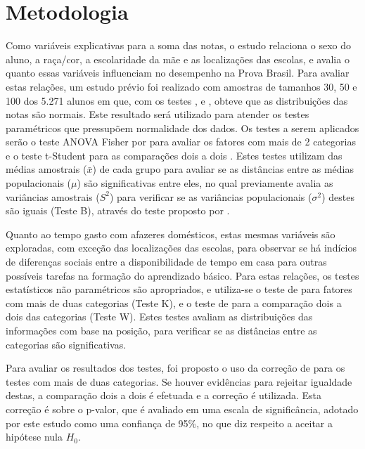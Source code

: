 

\chapter{Metodologia}
Como variáveis explicativas para a soma das notas, o estudo relaciona o sexo do aluno, a raça/cor, a escolaridade da mãe e as localizações das escolas,
e avalia o quanto essas variáveis influenciam no desempenho na Prova Brasil. Para avaliar estas relações, um estudo prévio foi realizado
com amostras de tamanhos 30, 50 e 100 dos 5.271 alunos em que, com os testes , 
e , obteve que as distribuições das notas são normais. Este resultado será utilizado para atender
os testes paramétricos que pressupõem normalidade dos dados. Os testes a serem aplicados serão o teste ANOVA Fisher por  para 
avaliar os fatores com mais de 2 categorias e o teste t-Student para as comparações dois a dois \cite{o1908student}.
Estes testes utilizam das médias amostrais ($\bar{x}$) de cada grupo para avaliar se as distâncias entre as médias 
populacionais ($\mu$) são significativas entre eles, no qual previamente avalia as
variâncias amostrais ($S^2$) para verificar se as variâncias populacionais ($\sigma^2$) destes são iguais (Teste B), através do teste proposto por .

Quanto ao tempo gasto com afazeres domésticos, estas mesmas variáveis são exploradas, com exceção das localizações das escolas,
para observar se há indícios de diferenças sociais entre a disponibilidade de tempo em casa para outras possíveis 
tarefas na formação do aprendizado básico. Para estas relações, os testes estatísticos não paramétricos são apropriados,
e utiliza-se o teste de  para fatores com mais de duas categorias (Teste K), e o
teste de  para a comparação dois a dois das categorias (Teste W). Estes testes avaliam as
distribuições das informações com base na posição, para verificar se as distâncias entre as categorias são significativas.

Para avaliar os resultados dos testes, foi proposto o uso da correção de  para os 
testes com mais de duas categorias. Se houver evidências para rejeitar igualdade destas, a comparação dois a dois é
efetuada e a correção é utilizada. Esta correção é sobre o p-valor, que é avaliado em uma escala de significância,
adotado por este estudo como uma confiança de 95\%, no que diz respeito a aceitar a hipótese nula $H_0$.